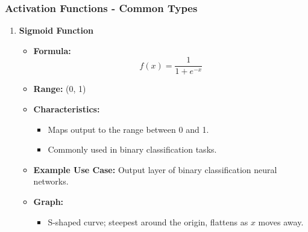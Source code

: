\documentclass[aspectratio=169]{beamer}
\begin{document}
\begin{frame}[fragile]
    \frametitle{Activation Functions - Common Types}
    \begin{enumerate}
        \item \textbf{Sigmoid Function}
            \begin{itemize}
                \item \textbf{Formula:}
                    \begin{equation*}
                    f(x) = \frac{1}{1 + e^{-x}}
                    \end{equation*}
                \item \textbf{Range:} (0, 1)
                \item \textbf{Characteristics:}
                    \begin{itemize}
                        \item Maps output to the range between 0 and 1.
                        \item Commonly used in binary classification tasks.
                    \end{itemize}
                \item \textbf{Example Use Case:} Output layer of binary classification neural networks.
                \item \textbf{Graph:}
                    \begin{itemize}
                        \item S-shaped curve; steepest around the origin, flattens as \(x\) moves away.
                    \end{itemize}
            \end{itemize}
        

\end{enumerate}
\end{frame}
\end{document}
